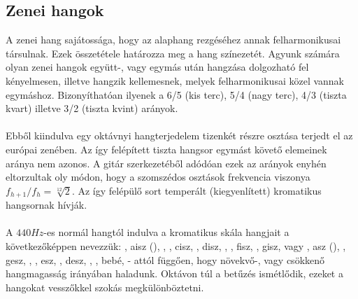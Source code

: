 \subsection{Zenei hangok}
\label{sec:zeneihangok}
A zenei hang sajátossága, hogy az alaphang rezgéséhez annak felharmonikusai társulnak. Ezek összetétele határozza meg a hang színezetét. Agyunk számára olyan zenei hangok együtt-, vagy egymás után hangzása dolgozható fel kényelmesen, illetve hangzik kellemesnek, melyek felharmonikusai közel vannak egymáshoz. Bizonyíthatóan ilyenek a 6/5 (kis terc), 5/4 (nagy terc), 4/3 (tiszta kvart) illetve 3/2 (tiszta kvint) arányok. \\\\
Ebből kiindulva egy oktávnyi hangterjedelem tizenkét részre osztása terjedt el az európai zenében.
Az így felépített tiszta hangsor egymást követő elemeinek aránya nem azonos. A gitár szerkezetéből adódóan ezek az arányok enyhén eltorzultak oly módon, hogy a szomszédos osztások frekvencia viszonya $f_{h+1}/f_{h}=\sqrt[12]{2}$. Az így felépülő sort temperált (kiegyenlített) kromatikus hangsornak hívják. \\\\
A $440Hz$-es normál  hangtól indulva a kromatikus skála hangjait a
következőképpen nevezzük: , aisz (), , ,
cisz, , disz, , , fisz, ,
gisz,  vagy , asz (), ,
gesz, , , esz, , desz, ,
, bebé,  - attól függően, hogy növekvő-, vagy csökkenő
hangmagasság irányában haladunk. Oktávon túl a betűzés ismétlődik, ezeket a
hangokat vesszőkkel szokás megkülönböztetni.
